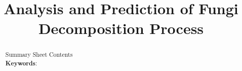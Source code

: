 \documentclass[12pt]{article}
\title{Analysis and Prediction of Fungi Decomposition Process}
\begin{document}
	\begin{abstract}
		Summary Sheet Contents\\
		\vspace{5pt}
		\textbf{Keywords}:
	\end{abstract}
	
	\maketitle
	\tableofcontents
	
	
	
	
	
	
	
	
	
	
\end{document}
